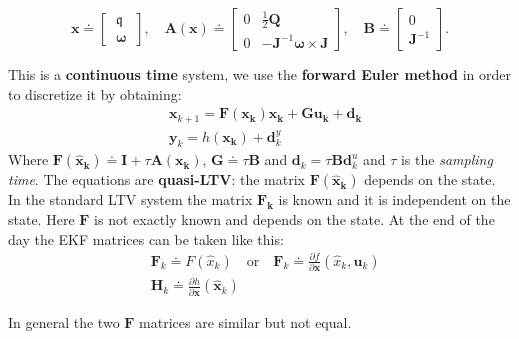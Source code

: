 \begin{equation*}
    \textbf{x} \doteq \begin{bmatrix}
        \ \mathfrak{q} \ \\
        \ \boldsymbol{\omega} \ 
    \end{bmatrix}, \quad 
    \mathbf{A(x)} \doteq \begin{bmatrix}
        0& \frac{1}{2}\mathbf{Q }\\
        0& -\mathbf{J}^{-1}\boldsymbol{\omega}\times \mathbf{J}
    \end{bmatrix}, \quad 
    \mathbf{B} \doteq \begin{bmatrix}
        0 \\ \mathbf{J}^{-1}
    \end{bmatrix}.
\end{equation*}

This is a \textbf{continuous time} system, we use the \textbf{forward Euler method} in order to discretize it by obtaining:
\begin{align*}
    &\mathbf{x}_{k+1} = \mathbf{F(x_k)x_k+G u_k + d_k}\\
    &\mathbf{y}_k = h(\mathbf{x_k})+\mathbf{d}_k^y
\end{align*}
Where $\mathbf{F(\hat{x}_k)} \doteq \mathbf{I}+\tau \mathbf{A(x_k)}$, $\mathbf{G}\doteq\tau\mathbf{B}$ and $\mathbf{d}_k = \tau \mathbf{Bd}_k^u$ and $\tau$ is the \textit{sampling time}. 
The equations are \textbf{quasi-LTV}: the matrix $\mathbf{F(\hat{x}_k)}$ depends on the state. In the standard LTV system the matrix $\mathbf{F_k}$ is known and it is independent on the state. Here $\mathbf{F}$ is not exactly known and depends on the state. At the end of the day the EKF matrices can be taken like this: 
\begin{align*}
    &\mathbf{F}_k \doteq F(\hat{x}_k) \quad \text{or} \quad
     \mathbf{F}_k \doteq \frac{\partial f}{\partial \mathbf{x}}(\hat{x}_k, \mathbf{u}_k)\\
    &\mathbf{H}_k \doteq \frac{\partial h}{\partial \mathbf{x}}(\hat{\mathbf{x}}_k)
\end{align*}

\noindent
In general the two $\mathbf{F}$ matrices are similar but not equal.\\

